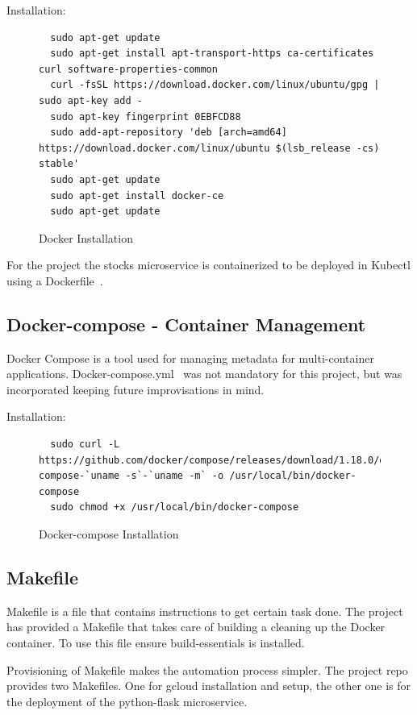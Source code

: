 Installation:
\begin{figure}[htb]
\begin{footnotesize}
\begin{verbatim}
  sudo apt-get update
  sudo apt-get install apt-transport-https ca-certificates curl software-properties-common
  curl -fsSL https://download.docker.com/linux/ubuntu/gpg | sudo apt-key add -
  sudo apt-key fingerprint 0EBFCD88
  sudo add-apt-repository 'deb [arch=amd64] https://download.docker.com/linux/ubuntu $(lsb_release -cs)  stable'
  sudo apt-get update
  sudo apt-get install docker-ce
  sudo apt-get update
\end{verbatim}
\end{footnotesize}
\caption{Docker Installation}\label{F:setup}
\end{figure}
For the project the stocks microservice is containerized to be deployed in
Kubectl using a Dockerfile~\cite{hid-sp18-417-Dockerfile}.

\subsection{Docker-compose - Container Management}
Docker Compose is a tool used for managing metadata for multi-container
applications. Docker-compose.yml~\cite{hid-sp18-417-docker-compose} was not
mandatory for this project, but was incorporated keeping future improvisations
in mind. 

Installation:

\begin{figure}[htb]
\begin{verbatim}
  sudo curl -L https://github.com/docker/compose/releases/download/1.18.0/docker-compose-`uname -s`-`uname -m` -o /usr/local/bin/docker-compose
  sudo chmod +x /usr/local/bin/docker-compose
\end{verbatim}
\caption{Docker-compose Installation}
\end{figure}

\subsection{Makefile}
Makefile is a file that contains instructions to get certain task done. The
project has provided a Makefile that takes care of building a cleaning up the
Docker container. To use this file ensure build-essentials is installed.

Provisioning of Makefile makes the automation process simpler. The project
repo provides two Makefiles. One for gcloud installation and setup, the other
one is for the deployment of the python-flask microservice.
  
